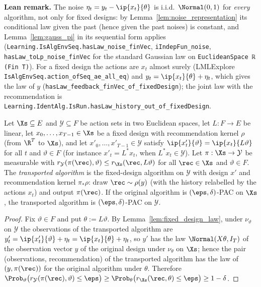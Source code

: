 \textbf{Lean remark.} The noise $\eta_t = y_t - \ip{x_t}{\theta}$ is i.i.d.\ $\Normal(0,1)$ for
\emph{every} algorithm, not only for fixed designs: by Lemma~\ref{lem:noise_representation} its
conditional law given the past (hence given the past noises) is constant, and
Lemma~\ref{lem:gauss_pi} in its sequential form applies
(\texttt{Learning.IsAlgEnvSeq.hasLaw\_noise\_finVec}, \texttt{iIndepFun\_noise},
\texttt{hasLaw\_toLp\_noise\_finVec} for the standard Gaussian law on
\texttt{EuclideanSpace ℝ (Fin T)}). For a fixed design the actions are $x_t$ almost surely
(LMLExplore \texttt{IsAlgEnvSeq.action\_ofSeq\_ae\_all\_eq}) and
$y_t = \ip{x_t}{\theta} + \eta_t$, which gives the law of $y$
(\texttt{hasLaw\_feedback\_finVec\_of\_fixedDesign}); the joint law with the recommendation is
\texttt{Learning.IdentAlg.IsRun.hasLaw\_history\_out\_of\_fixedDesign}.

\begin{lemma}\label{lem:fixed_design_transport}
\leanok
{}
Let $\Xs \subseteq E$ and $\mathcal Y \subseteq F$ be action sets in two Euclidean spaces, let
$L : F \to E$ be linear, let $x_0, \dots, x_{T-1} \in \Xs$ be a fixed design with
recommendation kernel $\rho$ (from $\R^T$ to $\Xs$), and let $x'_0, \dots, x'_{T-1} \in
\mathcal Y$ satisfy $\ip{x'_t}{\vartheta} = \ip{x_t}{L\vartheta}$ for all $t$ and
$\vartheta \in F$ (for instance $x'_t = L^*x_t$, when $L^*x_t \in \mathcal Y$). Let
$\pi : \Xs \to \mathcal Y$ be measurable with
$r_{\mathcal Y}(\pi(\rec), \vartheta) \le r_{\Xs}(\rec, L\vartheta)$ for all $\rec \in \Xs$ and
$\vartheta \in F$. The \emph{transported algorithm} is the fixed-design algorithm on
$\mathcal Y$ with design $x'$ and recommendation kernel $\pi_*\rho$: draw $\rec \sim \rho(y)$
(with the history relabelled by the actions $x_t$) and output $\pi(\rec)$. If the original
algorithm is $(\eps,\delta)$-PAC on $\Xs$, the transported algorithm is $(\eps,\delta)$-PAC on
$\mathcal Y$.
\end{lemma}

\begin{proof}
\leanok
{}
Fix $\vartheta \in F$ and put $\theta := L\vartheta$. By Lemma~\ref{lem:fixed_design_law},
under $\nu_\vartheta$ on $\mathcal Y$ the observations of the transported algorithm are
$y'_t = \ip{x'_t}{\vartheta} + \eta_t = \ip{x_t}{\theta} + \eta_t$, so $y'$ has the law
$\Normal(X\theta, I_T)$ of the observation vector $y$ of the original design under
$\nu_\theta$ on $\Xs$; hence the pair (observations, recommendation) of the transported
algorithm has the law of $(y, \pi(\rec))$ for the original algorithm under $\theta$. Therefore
$\Prob_\vartheta\big(r_{\mathcal Y}(\pi(\rec),\vartheta) \le \eps\big)
\ge \Prob_\theta\big(r_{\Xs}(\rec,\theta) \le \eps\big) \ge 1 - \delta$.
\end{proof}

